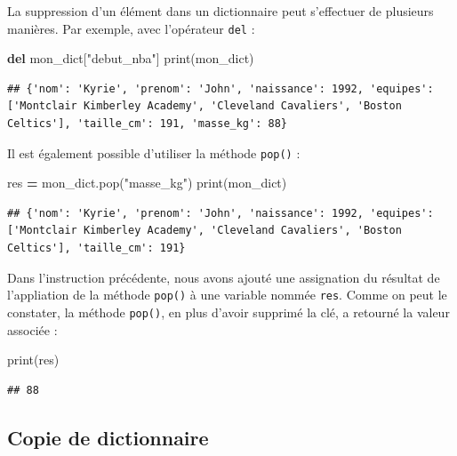 \documentclass[12pt,]{book}
\newenvironment{Shaded}{\begin{snugshade}}{\end{snugshade}}
\newcommand{\KeywordTok}[1]{\textcolor[rgb]{0.13,0.29,0.53}{\textbf{#1}}}
\newcommand{\StringTok}[1]{\textcolor[rgb]{0.31,0.60,0.02}{#1}}
\newcommand{\OperatorTok}[1]{\textcolor[rgb]{0.81,0.36,0.00}{\textbf{#1}}}
\newcommand{\BuiltInTok}[1]{#1}
\newcommand{\NormalTok}[1]{#1}
\numberwithin{equation}{section}
\numberwithin{countremarque}{section}
\begin{document}
La suppression d'un élément dans un dictionnaire peut s'effectuer de
plusieurs manières. Par exemple, avec l'opérateur \texttt{del} :

\begin{Shaded}
\begin{Highlighting}[]
\KeywordTok{del}\NormalTok{ mon_dict[}\StringTok{"debut_nba"}\NormalTok{]}
\BuiltInTok{print}\NormalTok{(mon_dict)}
\end{Highlighting}
\end{Shaded}

\begin{lstlisting}
## {'nom': 'Kyrie', 'prenom': 'John', 'naissance': 1992, 'equipes': ['Montclair Kimberley Academy', 'Cleveland Cavaliers', 'Boston Celtics'], 'taille_cm': 191, 'masse_kg': 88}
\end{lstlisting}

Il est également possible d'utiliser la méthode \texttt{pop()} :

\begin{Shaded}
\begin{Highlighting}[]
\NormalTok{res }\OperatorTok{=}\NormalTok{ mon_dict.pop(}\StringTok{"masse_kg"}\NormalTok{)}
\BuiltInTok{print}\NormalTok{(mon_dict)}
\end{Highlighting}
\end{Shaded}

\begin{lstlisting}
## {'nom': 'Kyrie', 'prenom': 'John', 'naissance': 1992, 'equipes': ['Montclair Kimberley Academy', 'Cleveland Cavaliers', 'Boston Celtics'], 'taille_cm': 191}
\end{lstlisting}

Dans l'instruction précédente, nous avons ajouté une assignation du
résultat de l'appliation de la méthode \texttt{pop()} à une variable
nommée \texttt{res}. Comme on peut le constater, la méthode
\texttt{pop()}, en plus d'avoir supprimé la clé, a retourné la valeur
associée :

\begin{Shaded}
\begin{Highlighting}[]
\BuiltInTok{print}\NormalTok{(res)}
\end{Highlighting}
\end{Shaded}

\begin{lstlisting}
## 88
\end{lstlisting}

\subsection{Copie de dictionnaire}\label{copie-de-dictionnaire}
\end{document}
